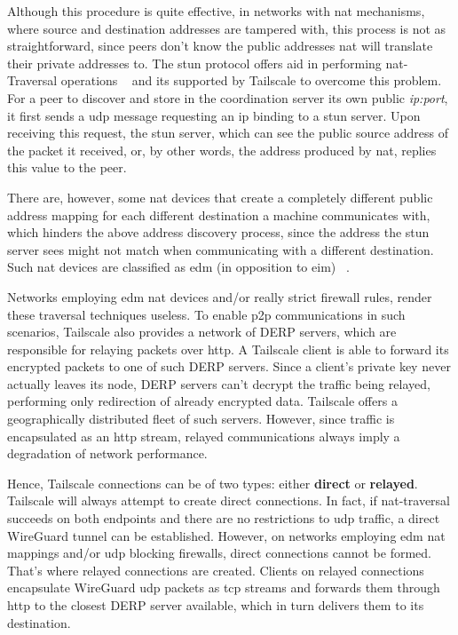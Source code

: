 \documentclass[11pt,twoside,a4paper]{report}
\begin{document}
Although this procedure is quite effective, in networks with \ac{nat} mechanisms, where source and destination addresses are tampered with, this process is not as straightforward, since peers don't know the public addresses \ac{nat} will translate their private addresses to. The \ac{stun} protocol offers aid in performing \ac{nat}-Traversal operations ~\cite{rfc8489} and its supported by Tailscale to overcome this problem. For a peer to discover and store in the coordination server its own public \emph{ip:port}, it first sends a \ac{udp} message requesting an \ac{ip} binding to a \ac{stun} server. Upon receiving this request, the \ac{stun} server, which can see the public source address of the packet it received, or, by other words, the address produced by \ac{nat}, replies this value to the peer.

There are, however, some \ac{nat} devices that create a completely different public address mapping for each different destination a machine communicates with, which hinders the above address discovery process, since the address the \ac{stun} server sees might not match when communicating with a different destination. Such \ac{nat} devices are classified as \ac{edm} (in opposition to \ac{eim}) ~\cite{rfc4787}.

Networks employing \ac{edm} \ac{nat} devices and/or really strict firewall rules, render these traversal techniques useless. To enable \ac{p2p} communications in such scenarios, Tailscale also provides a network of \ac{DERP} servers, which are responsible for relaying packets over \ac{http}. A Tailscale client is able to forward its encrypted packets to one of such \ac{DERP} servers. Since a client's private key never actually leaves its node, \ac{DERP} servers can't decrypt the traffic being relayed, performing only redirection of already encrypted data. Tailscale offers a geographically distributed fleet of such servers. However, since traffic is encapsulated as an \ac{http} stream, relayed communications always imply a degradation of network performance.

Hence, Tailscale connections can be of two types: either \textbf{direct} or \textbf{relayed}. Tailscale will always attempt to create direct connections. In fact, if \ac{nat}-traversal succeeds on both endpoints and there are no restrictions to \ac{udp} traffic, a direct WireGuard tunnel can be established. However, on networks employing \ac{edm} \ac{nat} mappings and/or \ac{udp} blocking firewalls, direct connections cannot be formed. That's where relayed connections are created. Clients on relayed connections encapsulate WireGuard \ac{udp} packets as \ac{tcp} streams and forwards them through \ac{http} to the closest \ac{DERP} server available, which in turn delivers them to its destination.
\end{document}
